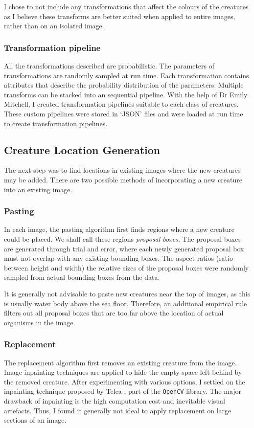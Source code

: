 \documentclass[12pt,a4paper,twoside,openany]{report}
\begin{document}
I chose to not include any transformations that affect the colours of the creatures as I believe these transforms are better suited when applied to entire images, rather than on an isolated image.

\subsubsection{Transformation pipeline}
All the transformations described are probabilistic. The parameters of transformations are randomly sampled at run time. Each transformation contains attributes that describe the probability distribution of the parameters. Multiple transforms can be stacked into an sequential pipeline. With the help of Dr Emily Mitchell, I created transformation pipelines suitable to each class of creatures. These custom pipelines were stored in `JSON' files and were loaded at run time to create  transformation pipelines.


\subsection{Creature Location Generation}
The next step was to find locations in existing images where the new creatures may be added. There are two possible methods of incorporating a new creature into an existing image. 

\subsubsection{Pasting}
In each image, the pasting algorithm first finds regions where a new creature could be placed. We shall call these regions \textit{proposal boxes}. The proposal boxes are generated through trial and error, where each newly generated proposal box must not overlap with any existing bounding boxes. The aspect ratios (ratio between height and width) the relative sizes of the proposal boxes were randomly sampled from actual bounding boxes from the data.

It is generally not advisable to paste new creatures near the top of images, as this is usually water body above the sea floor. Therefore, an additional empirical rule filters out all proposal boxes that are too far above the location of actual organisms in the image.

\subsubsection{Replacement}
The replacement algorithm first removes an existing creature from the image. Image inpainting techniques are applied to hide the empty space left behind by the removed creature. After experimenting with various options, I settled on the inpainting technique proposed by Telea \cite{telea_image_2004}, part of the \verb|OpenCV| library. The major drawback of inpainting is the high computation cost and inevitable visual artefacts. Thus, I found it generally not ideal to apply replacement on large sections of an image.
\end{document}
